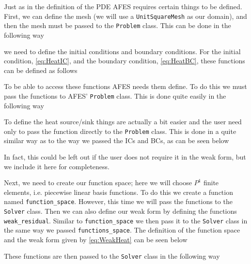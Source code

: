     Just as in the definition of the PDE AFES requires certain things to be
    defined. First, we can define the mesh (we will use a
    \texttt{UnitSquareMesh} as our domain), and then the mesh must be passed to
    the \texttt{Problem} class. This can be done in the following way
    
    we need to define the initial conditions and
    boundary conditions. For the initial condition, \eqref{eq:HeatIC}, and
    the boundary condition, \eqref{eq:HeatBC}, these functions can be defined
    as follows
    
    To be able to access these functions AFES needs them define. To do this we
    must pass the functions to AFES' \texttt{Problem} class. This is done quite
    easily in the following way
    
    To define the heat source/sink things are actually a bit easier and the user
    need only to pass the function directly to the \texttt{Problem} class. This
    is done in a quite similar way as to the way we passed the ICs and BCs, as
    can be seen below
    
    In fact, this could be left out if the user does not require it in the weak
    form, but we include it here for completeness.

    Next, we need to create our function space; here we will choose $P^1$ finite
    elements, i.e. piecewise linear basis functions. To do this we create a
    function named \texttt{function\_space}. However, this time we will pass the
    functions to the \texttt{Solver} class. Then we can also define our weak
    form by defining the functions \texttt{weak\_residual}. Similar to
    \texttt{function\_space} we then pass it to the \texttt{Solver} class in the
    same way we passed \texttt{functions\_space}. The definition of the function
    space and the weak form given by \eqref{eq:WeakHeat} can be seen below
    
    These functions are then passed to the \texttt{Solver} class in the
    following way
    

